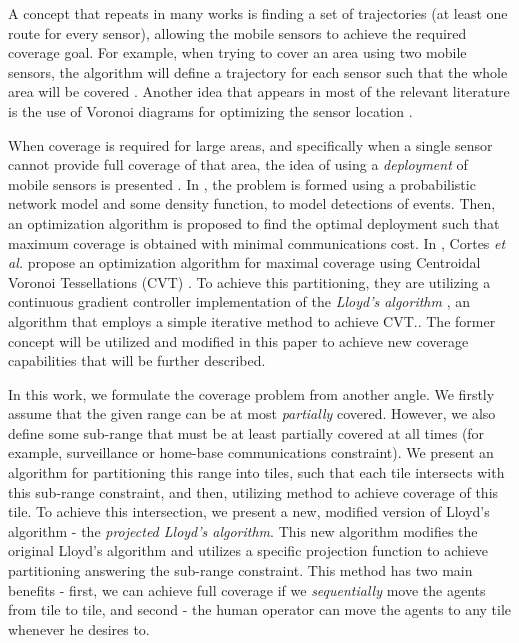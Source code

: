 \documentclass{iacas}
\begin{document}
A concept that repeats in many works is finding a set of trajectories (at least one route for every sensor), allowing the mobile sensors to achieve the required coverage goal.  For example, when trying to cover an area using two mobile sensors, the algorithm will define a trajectory for each sensor such that the whole area will be covered \cite{Atinc2013,Hussein2007}.
Another idea that appears in most of the relevant literature is the use of Voronoi diagrams for optimizing the sensor location \cite{Cortes2004,Hussein2007}. 

When coverage is required for large areas, and specifically when a single sensor cannot provide full coverage of that area, the idea of using a \emph{deployment} of mobile sensors is presented \cite{Cassandras2005, Cortes2004}. In \cite{Li2005}, the problem is formed using a probabilistic network model and some density function, to model detections of events. Then, an optimization algorithm is proposed to find the optimal deployment such that maximum coverage is obtained with minimal communications cost. In \cite{Cortes2004}, Cortes \textit{et al.} propose an optimization algorithm for maximal coverage using Centroidal Voronoi Tessellations (CVT) \cite{Du1999}. To achieve this partitioning, they are utilizing a continuous gradient controller implementation of the \emph{Lloyd's algorithm} \cite{Lloyd1982}, an algorithm that employs a simple iterative method to achieve CVT.. The former concept will be utilized and modified in this paper to achieve new coverage capabilities that will be further described.

In this work, we formulate the coverage problem from another angle. We firstly assume that the given range can be at most \emph{partially} covered. However, we also define some sub-range that must be at least partially covered at all times (for example, surveillance or home-base communications constraint). We present an algorithm for partitioning this range into tiles, such that each tile intersects with this sub-range constraint, and then, utilizing \cite{Cortes2004} method to achieve coverage of this tile. To achieve this intersection, we present a new, modified version of Lloyd's algorithm - the \emph{projected Lloyd's algorithm}. This new algorithm modifies the original Lloyd's algorithm and utilizes a specific projection function to achieve partitioning answering the sub-range constraint. This method has two main benefits - first, we can achieve full coverage if we \emph{sequentially} move the agents from tile to tile, and second - the human operator can move the agents to any tile whenever he desires to. %
\end{document}
